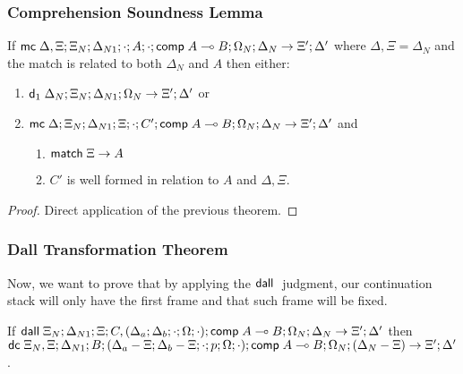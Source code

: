 \subsubsection{Comprehension Soundness Lemma}

\begin{lemma}
If $\mathsf{mc} \; \Delta, \Xi; \Xi_N; \Delta_{N1}; \cdot; A; \cdot; \mathsf{comp} \; A \multimap B; \Omega_N; \Delta_N \rightarrow \Xi'; \Delta'$ where $\Delta, \Xi = \Delta_N$ and the match is related to both $\Delta_N$ and $A$ then either:

\begin{enumerate}
   \item $\mathsf{d}_1 \; \Delta_N; \Xi_N; \Delta_{N1}; \Omega_N \rightarrow \Xi'; \Delta'$ or
   \item $\mathsf{mc} \; \Delta; \Xi_N; \Delta_{N1}; \Xi; \cdot; C'; \mathsf{comp} \; A \multimap B; \Omega_N; \Delta_N \rightarrow \Xi'; \Delta'$ and
      \begin{enumerate}
         \item $\mathsf{match} \; \Xi \rightarrow A$
         \item $C'$ is well formed in relation to $A$ and $\Delta, \Xi$.
      \end{enumerate}
\end{enumerate}
\end{lemma}

\begin{proof}
Direct application of the previous theorem.
\end{proof}

\subsubsection{Dall Transformation Theorem}

Now, we want to prove that by applying the $\mathsf{dall} \;$ judgment, our continuation stack will only have the first frame and that such frame will be fixed.

\begin{theorem}
If $\mathsf{dall} \; \Xi_N; \Delta_{N1}; \Xi; C, (\Delta_a; \Delta_b; \cdot; \Omega; \cdot); \mathsf{comp} \; A \multimap B; \Omega_N; \Delta_N \rightarrow \Xi'; \Delta'$ then 
$\mathsf{dc} \; \Xi_N, \Xi; \Delta_{N1}; B; (\Delta_a - \Xi; \Delta_b - \Xi; \cdot; p; \Omega; \cdot); \mathsf{comp} \; A \multimap B; \Omega_N; (\Delta_N - \Xi) \rightarrow \Xi'; \Delta'$.
\end{theorem}

